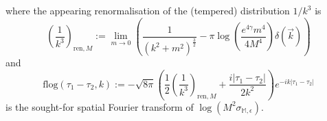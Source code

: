 \documentclass[a4paper,10pt,twoside]{article}
\numberwithin{equation}{section}
\newcounter{and}
\def\bbM{\mathbb{M}}
\theoremstyle{plain}
\theoremstyle{definition}
\begin{document}
where the appearing renormalisation of the (tempered) distribution $1/k^3$ is 
\begin{equation}\label{eq_regk3}\left(\frac{1}{k^3}\right)_{\text{ren},M}:=\lim_{m\to 0}\left(\frac{1}{(k^2+m^2)^{\frac32}}-\pi\log\left(\frac{e^{4\gamma}m^4}{4 M^4}\right)\delta(\vec{k})\right)\end{equation}
and
\begin{equation}\label{eq_flog}
\text{flog}(\tau_1-\tau_2,k):=-\sqrt{8\pi}\left(\frac{1}{2}\left(\frac{1}{k^3}\right)_{\text{ren},M}+\frac{i|\tau_1-\tau_2|}{2k^2}\right)e^{-ik|\tau_1-\tau_2|}
\end{equation}
is the sought-for spatial Fourier transform of $\log \left(M^2 \sigma_{\bbM,\epsilon}\right)$.




\end{document}
